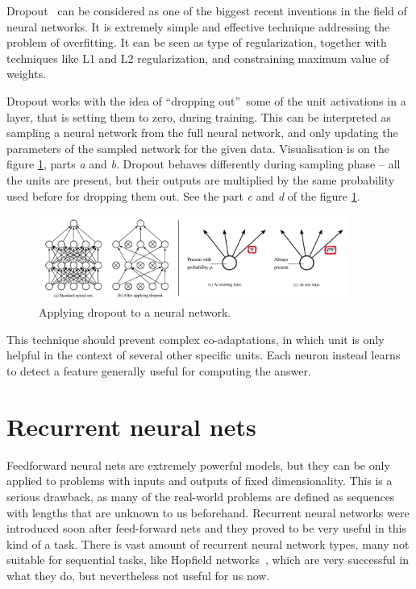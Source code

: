 Dropout~\cite{DBLP:journals/corr/abs-1207-0580, JMLR:v15:srivastava14a} can be considered as one of the biggest recent inventions in the field of neural networks. It is extremely simple and effective technique addressing the problem of overfitting. It can be seen as type of regularization, together with techniques like L1 and L2 regularization, and constraining maximum value of weights.

Dropout works with the idea of \textquotedblleft dropping out\textquotedblright\ some of the unit activations in a layer, that is setting them to zero, during training. This can be interpreted as sampling a neural network from the full neural network, and only updating the parameters of the sampled network for the given data. Visualisation is on the figure \ref{fig:dropout}, parts \emph{a} and \emph{b}. Dropout behaves differently during sampling phase -- all the units are present, but their outputs are multiplied by the same probability used before for dropping them out. See the part \emph{c} and \emph{d} of the figure \ref{fig:dropout}.

\begin{figure}[!t]
	\centering
	\includegraphics[width=0.9\textwidth]{fig/dropout.pdf}
	\caption{Applying dropout to a neural network. \cite{JMLR:v15:srivastava14a}
		\label{fig:dropout}}
\end{figure}

This technique should prevent complex co-adaptations, in which unit is only helpful in the context of several other specific units. Each neuron instead learns to detect a feature generally useful for computing the answer.

	\section{Recurrent neural nets}
Feedforward neural nets are extremely powerful models, but they can be only applied to problems with inputs and outputs of fixed dimensionality. This is a serious drawback, as many of the real-world problems are defined as sequences with lengths that are unknown to us beforehand. Recurrent neural networks were introduced soon after feed-forward nets and they proved to be very useful in this kind of a task. There is vast amount of recurrent neural network types, many not suitable for sequential tasks, like Hopfield networks~\cite{hopfield1982neural}, which are very successful in what they do, but nevertheless not useful for us now.

